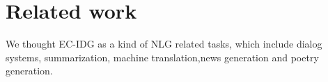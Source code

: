 \documentclass[letterpaper]{article} %
\begin{document}
\section{Related work}
We thought EC-IDG as a kind of NLG related tasks, which include dialog systems, summarization, machine translation,news generation and poetry generation. 

  
\end{document}
